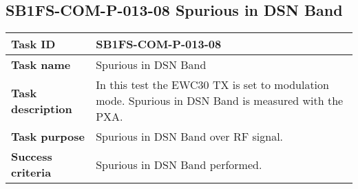 \renewcommand{\procid}{SB1FS-COM-P-013}
\renewcommand{\subprocid}{\procid-08}
\renewcommand{\procname}{Spurious in DSN Band}

\newpage
\subsection{\subprocid{} \procname}\label{sec:dataSpuriousDNS}

\begin{table}[H]
	\centering
	\footnotesize
	\begin{tabular}{|L{3.0cm}|L{13.0cm}|}\hline
	 \textbf{Task ID} & \subprocid{} \\\hline
	 \textbf{Task name} & \procname \\\hline
	 \textbf{Task description} & In this test the EWC30 TX is set to modulation mode. Spurious in DSN Band is measured with the PXA.\\ \hline
	 \textbf{Task purpose} & Spurious in DSN Band over RF signal.\\\hline
	 \textbf{Success criteria} & Spurious in DSN Band performed.\\\hline


\end{tabular}
\end{table}
